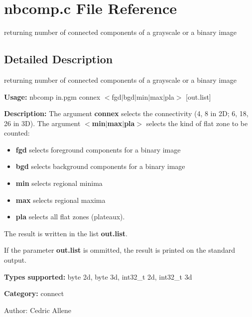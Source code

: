 \section{nbcomp.c File Reference}
\label{nbcomp_8c}
returning number of connected components of a grayscale or a binary image 



\subsection{Detailed Description}
returning number of connected components of a grayscale or a binary image 

{\bf Usage:} nbcomp in.pgm connex $<$fgd$|$bgd$|$min$|$max$|$pla$>$ [out.list]

{\bf Description:} The argument {\bf connex} selects the connectivity (4, 8 in 2D; 6, 18, 26 in 3D). The argument {\bf $<$min$|$max$|$pla$>$} selects the kind of flat zone to be counted: \begin{itemize}
\item {\bf fgd} selects foreground components for a binary image \item {\bf bgd} selects background components for a binary image \item {\bf min} selects regional minima \item {\bf max} selects regional maxima \item {\bf pla} selects all flat zones (plateaux).\end{itemize}
The result is written in the list {\bf out.list}.

If the parameter {\bf out.list} is ommitted, the result is printed on the standard output.

{\bf Types supported:} byte 2d, byte 3d, int32\_\-t 2d, int32\_\-t 3d

{\bf Category:} connect

\begin{Desc}
\item[Author:]Cedric Allene \end{Desc}
